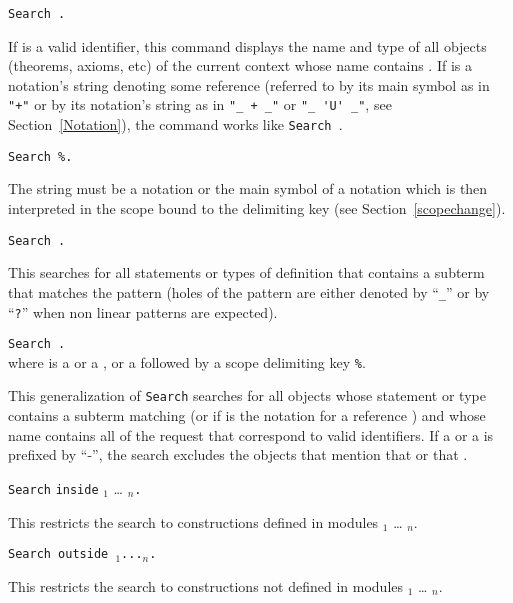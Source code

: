 \begin{Variants}
\item {\tt Search {\str}.}

If {\str} is a valid identifier, this command displays the name and type
of all objects (theorems, axioms, etc) of the current context whose
name contains {\str}. If {\str} is a notation's string denoting some
reference {\qualid} (referred to by its main symbol as in \verb="+"=
or by its notation's string as in \verb="_ + _"= or \verb="_ 'U' _"=, see
Section~\ref{Notation}), the command works like {\tt Search
{\qualid}}.

\item {\tt Search {\str}\%{\delimkey}.}

The string {\str} must be a notation or the main symbol of a notation
which is then interpreted in the scope bound to the delimiting key
{\delimkey} (see Section~\ref{scopechange}).

\item {\tt Search {\termpattern}.}

This searches for all statements or types of definition that contains
a subterm that matches the pattern {\termpattern} (holes of the
pattern are either denoted by ``{\texttt \_}'' or
by ``{\texttt ?{\ident}}'' when non linear patterns are expected).

\item {\tt Search \nelist{\zeroone{-}{\termpatternorstr}}{}.}\\

\noindent where {\termpatternorstr} is a
{\termpattern} or a {\str}, or a {\str} followed by a scope
delimiting key {\tt \%{\delimkey}}.

This generalization of {\tt Search} searches for all objects
whose statement or type contains a subterm matching {\termpattern} (or
{\qualid} if {\str} is the notation for a reference {\qualid}) and
whose name contains all {\str} of the request that correspond to valid
identifiers. If a {\termpattern} or a {\str} is prefixed by ``-'', the
search excludes the objects that mention that {\termpattern} or that
{\str}.

\item
  {\tt Search} \nelist{{\termpatternorstr}}{}
    {\tt inside} {\module$_1$} \ldots{} {\module$_n$}{\tt .}

This restricts the search to constructions defined in modules
{\module$_1$} \ldots{} {\module$_n$}.

\item
  {\tt Search \nelist{{\termpatternorstr}}{}
     outside {\module$_1$}...{\module$_n$}.}

This restricts the search to constructions not defined in modules
{\module$_1$} \ldots{} {\module$_n$}.

\end{Variants}

